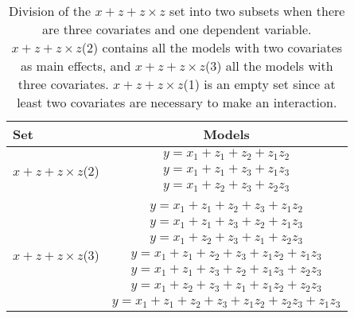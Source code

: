 \begin{table}
\centering
\caption{Division of the $x + z + z \times z$ set into two subsets when there are three covariates and one dependent variable. $x + z + z \times z$(2) contains all the models with two covariates as main effects, and $x + z + z \times z$(3) all the models with three covariates. $x + z + z \times z$(1) is an empty set since at least two covariates are necessary to make an interaction.}
\label{tab:appmodel4}
\begin{tabular}{lc} 
\toprule
Set & Models \\ 
\midrule
\multirow{3}{*}{$x + z + z \times z$(2)} & $y=x_1+z_1+z_2+z_1z_2$\\ & $y=x_1+z_1+z_3+z_1z_3$\\ & $y=x_1+z_2+z_3+z_2z_3$\\ &  \\  
\multirow{7}{*}{$x + z + z \times z$(3)} & $y=x_1+z_1+z_2+z_3+z_1z_2$\\ & $y=x_1+z_1+z_3+z_2+z_1z_3$\\ & $y=x_1+z_2+z_3+z_1+z_2z_3$\\ & $y=x_1+z_1+z_2+z_3+z_1z_2+z_1z_3$\\ & $y=x_1+z_1+z_3+z_2+z_1z_3+z_2z_3$\\ & $y=x_1+z_2+z_3+z_1+z_1z_2+z_2z_3$\\ & $y=x_1+z_1+z_2+z_3+z_1z_2+z_2z_3+z_1z_3$\\ 
\bottomrule
\end{tabular}
\end{table}

